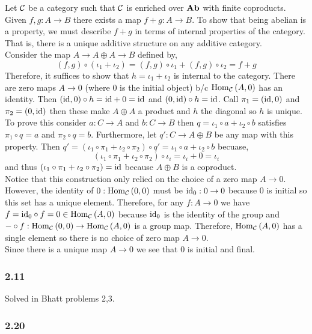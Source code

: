 \documentclass[12pt]{article}
\begin{document}
Let $\mathcal{C}$ be a category such that $\mathcal{C}$ is enriched over $\mathbf{Ab}$ with finite coproducts. Given $f, g : A \to B$ there exists a map $f + g : A \to B$. To show that being abelian is a property, we must describe $f + g$ in terms of internal properties of the category. That is, there is a unique additive structure on any additive category.
\bigskip\\
Consider the map $A \to A \oplus A \to B$ defined by,
\[ (f, g) \circ (\iota_1 + \iota_2) = (f, g) \circ \iota_1 + (f, g) \circ \iota_2 = f + g \]
Therefore, it suffices to show that $h = \iota_1 + \iota_2$ is internal to the category. There are zero maps $A \to 0$ (where $0$ is the initial object) b/c $\mathrm{Hom}_{\mathcal{C}} \left( A, 0 \right)$ has an identity. Then $(\mathrm{id}, 0) \circ h = \mathrm{id} + 0 = \mathrm{id}$ and $(0, \mathrm{id}) \circ h = \mathrm{id}$. Call $\pi_1 = (\mathrm{id}, 0)$ and $\pi_2 = (0, \mathrm{id})$ then these make $A \oplus A$ a product and $h$ the diagonal so $h$ is unique.
\bigskip\\
To prove this consider $a : C \to A$ and $b : C \to B$ then $q = \iota_1 \circ a + \iota_2 \circ b$ satisfies $\pi_1 \circ q = a$ and $\pi_2 \circ q = b$. Furthermore, let $q' : C \to A \oplus B$ be any map with this property. Then $q' = (\iota_1 \circ \pi_1 + \iota_2 \circ \pi_2) \circ q' = \iota_1 \circ a + \iota_2 \circ b$ becuase,
\[ (\iota_1 \circ \pi_1 + \iota_2 \circ \pi_2) \circ \iota_i = \iota_i + 0 = \iota_i \]
and thus $(\iota_1 \circ \pi_1 + \iota_2 \circ \pi_2) = \mathrm{id}$ because $A \oplus B$ is a coproduct.  
\bigskip\\
Notice that this construction only relied on the choice of a zero map $A \to 0$. However, the identity of $0 : \mathrm{Hom}_{\mathcal{C}} \left( 0, 0 \right)$ must be $\mathrm{id}_0 : 0 \to 0$ because $0$ is initial so this set has a unique element. Therefore, for any $f : A \to 0$ we have $f = \mathrm{id}_0 \circ f = 0 \in \mathrm{Hom}_{\mathcal{C}} \left( A, 0 \right)$ because $\mathrm{id}_0$ is the identity of the group and $- \circ f : \mathrm{Hom}_{\mathcal{C}} \left( 0, 0 \right) \to \mathrm{Hom}_{\mathcal{C}} \left( A, 0 \right)$ is a group map. Therefore, $\mathrm{Hom}_{\mathcal{C}} \left( A, 0 \right)$ has a single element so there is no choice of zero map $A \to 0$.
\bigskip\\
Since there is a unique map $A \to 0$ we see that $0$ is initial and final. 


\subsubsection*{2.11}

Solved in Bhatt problems 2,3.

\subsubsection*{2.20}
\end{document}
